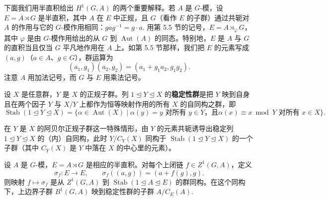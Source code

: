 下面我们用半直积给出 \(H^1(G, A)\) 的两个重要解释。若 \(A\) 是 \(G\)-模，设 \(E = A \rtimes G\) 是半直积，其中 \(A\) 在 \(E\) 中正规，且 \(G\)（看作 \(E\) 的子群）通过共轭对 \(A\) 的作用与它的 \(G\)-模作用相同：\(gag^{-1} = g \cdot a\). 用第 5.5 节的记号，\(E = A \rtimes_\varphi G\)，其中 \(\varphi\) 是由 \(G\)-模作用给出的从 \(G\) 到 \(\operatorname{Aut}(A)\) 的同态。特别地，\(E\) 是 \(A\) 与 \(G\) 的直积当且仅当 \(G\) 平凡地作用在 \(A\) 上。如第 5.5 节那样，我们把 \(E\) 的元素写成 \((a, g)\)（\(a \in A\)、\(g \in G\)），群运算为
\[
(a_1, g_1)(a_2, g_2) = (a_1+g_1a_2, g_1g_2).
\]
注意 \(A\) 用加法记号，而 \(G\) 与 \(E\) 用乘法记号。

\begin{definition}
设 \(X\) 是任意群，\(Y\) 是 \(X\) 的正规子群。列 \(1 \trianglelefteq Y \trianglelefteq X\) 的\textbf{稳定性群}是把 \(Y\) 映到自身且在两个因子 \(Y\) 与 \(X/Y\) 上都作为恒等映射作用的所有 \(X\) 的自同构之群，即
\[
\operatorname{Stab}(1 \trianglelefteq Y \trianglelefteq X) = \{\alpha \in \operatorname{Aut}(X) \mid \alpha(y) = y \text{ 对所有 } y \in Y，且 \alpha(x) \equiv x \bmod Y \text{ 对所有 } x \in X\}.
\]
\end{definition}

在 \(Y\) 是 \(X\) 的阿贝尔正规子群这一特殊情形，由 \(Y\) 的元素共轭诱导出稳定列 \(1 \trianglelefteq Y \trianglelefteq X\) 的（内）自同构，此时 \(Y/C_Y(X)\) 同构于 \(\operatorname{Stab}(1 \trianglelefteq Y \trianglelefteq X)\) 的一个子群（其中 \(C_Y(X)\) 是 \(Y\) 中落在 \(X\) 的中心里的元素）。

\begin{proposition}\label{pro:17.31}
设 \(A\) 是 \(G\)-模，\(E = A \rtimes G\) 是相应的半直积。对每个上闭链 \(f \in Z^1(G, A)\)，定义
\[
\sigma_f : E \to E, \qquad \sigma_f((a, g)) = (a+f(g), g).
\]
则映射 \(f \mapsto \sigma_f\) 是从 \(Z^1(G, A)\) 到 \(\operatorname{Stab}(1 \trianglelefteq A \trianglelefteq E)\) 的群同构。在这个同构下，上边界子群 \(B^1(G, A)\) 映到稳定性群的子群 \(A/C_E(A)\).
\end{proposition}

